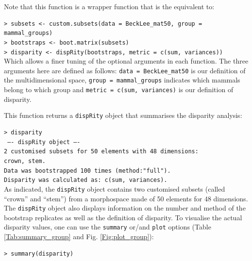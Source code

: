 \documentclass[12pt,letterpaper]{article}
\newcommand{\disp}{\texttt{dispRity} }
\begin{document}
\noindent Note that this function is a wrapper function that is the equivalent to:

\noindent \texttt{> subsets <- custom.subsets(data = BeckLee\_mat50, group = mammal\_groups)}\\
\noindent \texttt{> bootstraps <- boot.matrix(subsets)}\\
\noindent \texttt{> disparity <- dispRity(bootstraps, metric = c(sum, variances))}\\

\noindent Which allows a finer tuning of the optional arguments in each function.
The three arguments here are defined as follows: \texttt{data = BeckLee\_mat50} is our definition of the multidimensional space, \texttt{group = mammal\_groups} indicates which mammals belong to which group and \texttt{metric = c(sum, variances)} is our definition of disparity. 

This function returns a \disp object that summarises the disparity analysis:

\noindent \texttt{> disparity}\\
\noindent \texttt{ ---- dispRity object ---- }\\
\noindent \texttt{2 customised subsets for 50 elements with 48 dimensions:}\\
          \texttt{crown, stem.}\\
\noindent \texttt{Data was bootstrapped 100 times (method:"full").}\\
\noindent \texttt{Disparity was calculated as: c(sum, variances).}\\

\bigskip
As indicated, the \disp object contains two customised subsets (called ``crown'' and ``stem'') from a morphospace made of 50 elements for 48 dimensions.
The \disp object also displays information on the number and method of the bootstrap replicates as well as the definition of disparity.
To visualise the actual disparity values, one can use the \texttt{summary} or/and \texttt{plot} options (Table \ref{Tab:summary_group} and Fig. \ref{Fig:plot_group}):



\noindent \texttt{> summary(disparity)}
\end{document}
